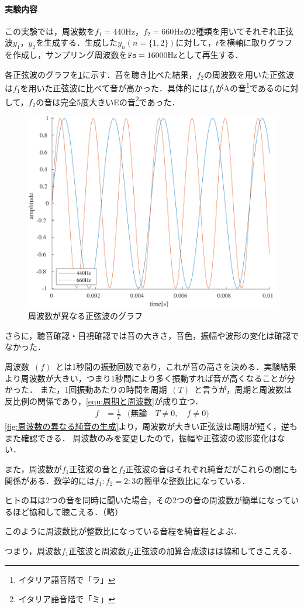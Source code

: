 \paragraph{実験内容}この実験では，周波数を\(f_1=440\textrm{Hz}\)，\(f_2=660\textrm{Hz}\)の2種類を用いてそれぞれ正弦波\(y_1\)，\(y_2\)を生成する．生成した\(y_n(n=\{1,2\})\)に対して，\(t\)を横軸に取りグラフを作成し，サンプリング周波数を\(\textrm{\texttt{Fs}}=16000\textrm{Hz}\)として再生する．\par
{}
\result
各正弦波のグラフを\ref{fig:\kadaiaa}に示す．音を聴き比べた結果，\(f_2\)の周波数を用いた正弦波は\(f_1\)を用いた正弦波に比べて音が高かった．具体的には\(f_1\)がAの音\footnote{イタリア語音階で「ラ」}であるのに対して，\(f_2\)の音は完全5度大きいEの音\footnote{イタリア語音階で「ミ」}であった．
\begin{figure}
    \caption{周波数が異なる正弦波のグラフ}
    \label{fig:\kadaiaa}
    \includegraphics[keepaspectratio,width=.3\textwidth]{../../Figures/01_01.pdf}
\end{figure}
さらに，聴音確認・目視確認では音の大きさ，音色，振幅や波形の変化は確認でなかった．\par
\consideration 周波数\ \((f)\)\ とは1秒間の振動回数であり，これが音の高さを決める．実験結果より周波数が大きい，つまり1秒間により多く振動すれば音が高くなることが分かった．
また，1回振動あたりの時間を周期\ \((T)\)\ と言うが，周期と周波数は反比例の関係であり，\eqref{equ:周期と周波数}が成り立つ．
\begin{align}
    f & =\frac{1}{T} & \big(\textrm{無論}\quad T\neq 0,\quad f\neq 0\big)\label{equ:周期と周波数}
\end{align}
\ref{fig:周波数の異なる純音の生成}より，周波数が大きい正弦波は周期が短く，逆もまた確認できる．
周波数のみを変更したので，振幅や正弦波の波形変化はない．\par
また，周波数が\(f_1\)正弦波の音と\(f_2\)正弦波の音はそれぞれ純音だがこれらの間にも関係がある．数学的には\(f_1:f_2=2:3\)の簡単な整数比になっている．
\begin{leftbar}
    ヒトの耳は2つの音を同時に聞いた場合，その2つの音の周波数が簡単になっているほど協和して聴こえる．（略）\par
    このように周波数比が整数比になっている音程を純音程とよぶ．\hfill{\cite[p.46-p.47]{音響工学理論基礎}}
\end{leftbar}
つまり，周波数\(f_1\)正弦波と周波数\(f_2\)正弦波の加算合成波はは協和してきこえる．
